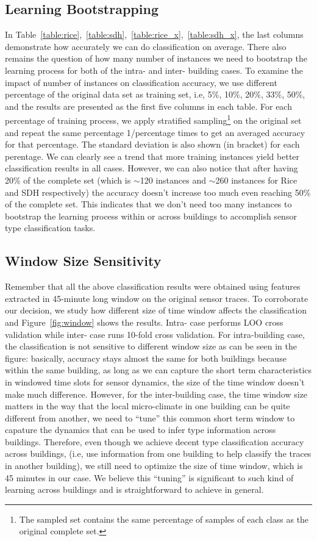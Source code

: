 \subsection{Learning Bootstrapping}
In Table~\ref{table:rice},~\ref{table:sdh},~\ref{table:rice_x},~\ref{table:sdh_x}, the last columns demonstrate how accurately we can do classification on average. There also remains the question of how many number of instances we need to bootstrap the learning process for both of the intra- and inter- building cases. To examine the impact of number of instances on classification accuracy, we use different percentage of the original data set as training set, i.e, 5\%, 10\%, 20\%, 33\%,
50\%, and the results are presented as the first five columns in each table. For each percentage of training process, we apply stratified sampling\footnote{The sampled set contains the same percentage of samples of each class as the original complete set.} on the original set and repeat the same percentage 1/percentage times to get an averaged accuracy for that percentage. The standard deviation is also shown (in bracket) for each perentage. We can clearly see a trend that more
training instances yield better classification results in all cases. However, we can also notice that after having 20\% of the complete set (which is $\sim$120 instances and $\sim$260 instances for Rice and SDH respectively) the accuracy doesn't increase too much even reaching 50\% of the complete set. This indicates that we don't need too many instances to bootstrap the learning process within or across buildings to accomplish sensor type classification tasks.

\subsection{Window Size Sensitivity}
Remember that all the above classification results were obtained using features extracted in 45-minute long window on the original sensor traces. To corroborate our decision, we study how different size of time window affects the classification and Figure~\ref{fig:window} shows the results. Intra- case performs LOO cross validation while inter- case runs 10-fold cross validation. For intra-building case, the classification is not sensitive to different window size as can be seen in the figure: basically, accuracy stays almost the same for both buildings because within the same building, as long as we can capture the short term characteristics in windowed time slots for sensor dynamics, the size of the time window doesn't make much difference. However, for the inter-building case, the time window size matters in the way that the local micro-climate in one building can be quite different from another, we need to ``tune'' this common short term window to capature the dynamics that can be used to infer type information across buildings. Therefore, even though we achieve decent type classification accuracy across buildings, (i.e, use information from one building to help classify the traces in another building), we still need to optimize the size of time window, which is 45 minutes in our case. We believe this ``tuning'' is significant to such kind of learning across buildings and is straightforward to achieve in general.

